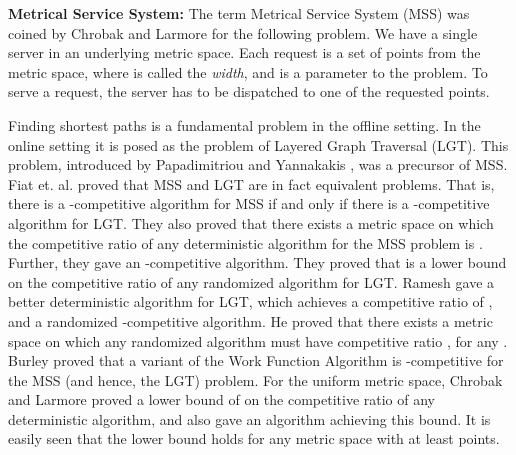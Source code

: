 \documentclass[11pt]{article}
\theoremstyle{plain}\newtheorem{theorem}{Theorem}
\theoremstyle{definition}
\theoremstyle{remark}
\begin{document}
\noindent
\textbf{Metrical Service System:} The term Metrical Service System (MSS) was coined by Chrobak and Larmore \cite{ChrobakL93} for the following problem. We have a single server in an underlying metric space. Each request is a set of  points from the metric space, where  is called the \textit{width}, and is a parameter to the problem. To serve a request, the server has to be dispatched to one of the requested points.

Finding shortest paths is a fundamental problem in the offline setting. In the online setting it is posed as the problem of Layered Graph Traversal (LGT). This problem, introduced by Papadimitriou and Yannakakis \cite{PapadimitriouY91}, was a precursor of MSS. Fiat et. al. \cite{FiatFKRRV98} proved that MSS and LGT are in fact equivalent problems. That is, there is a -competitive algorithm for MSS if and only if there is a -competitive algorithm for LGT. They also proved that there exists a metric space on which the competitive ratio of any deterministic algorithm for the MSS problem is .
Further, they gave an -competitive algorithm. They proved that  is a lower bound on the competitive ratio of any randomized algorithm for LGT. Ramesh \cite{Ramesh95} gave a better deterministic algorithm for LGT, which achieves a competitive ratio of , and a randomized -competitive algorithm. He proved that there exists a metric space on which any randomized algorithm must have competitive ratio , for any . Burley \cite{Burley96} proved that a variant of the Work Function Algorithm is -competitive for the MSS (and hence, the LGT) problem. For the uniform metric space, Chrobak and Larmore \cite{ChrobakL93} proved a lower bound of  on the competitive ratio of any deterministic algorithm, and also gave an algorithm achieving this bound. It is easily seen that the lower bound holds for any metric space with at least  points.
\end{document}
